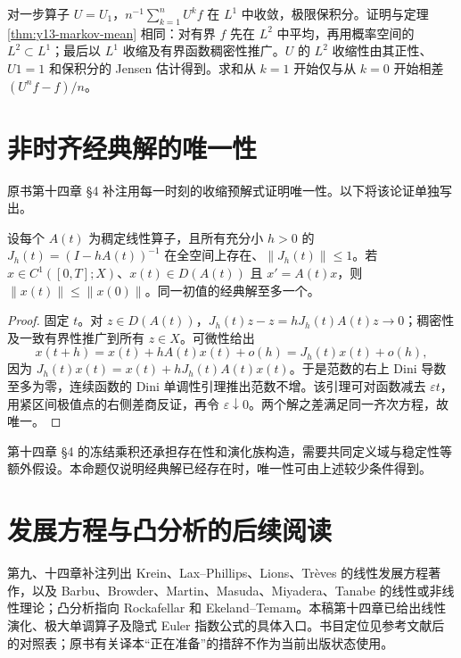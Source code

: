 对一步算子 $U=U_1$，$n^{-1}\sum_{k=1}^nU^kf$ 在 $L^1$ 中收敛，极限保积分。证明与定理 \ref{thm:y13-markov-mean} 相同：对有界 $f$ 先在 $L^2$ 中平均，再用概率空间的 $L^2\subset L^1$；最后以 $L^1$ 收缩及有界函数稠密性推广。$U$ 的 $L^2$ 收缩性由其正性、$U1=1$ 和保积分的 Jensen 估计得到。求和从 $k=1$ 开始仅与从 $k=0$ 开始相差 $(U^nf-f)/n$。

\section*{非时齐经典解的唯一性}
\label{sec:supp-uniqueness}
原书第十四章 §4 补注用每一时刻的收缩预解式证明唯一性。以下将该论证单独写出。
\begin{proposition}[冻结时刻的预解式估计]
设每个 $A(t)$ 为稠定线性算子，且所有充分小 $h>0$ 的 $J_h(t)=(I-hA(t))^{-1}$ 在全空间上存在、$\|J_h(t)\|\le1$。若 $x\in C^1([0,T];X)$、$x(t)\in D(A(t))$ 且 $x'=A(t)x$，则 $\|x(t)\|\le\|x(0)\|$。同一初值的经典解至多一个。
\end{proposition}
\begin{proof}
固定 $t$。对 $z\in D(A(t))$，$J_h(t)z-z=hJ_h(t)A(t)z\to0$；稠密性及一致有界性推广到所有 $z\in X$。可微性给出
\[
 x(t+h)=x(t)+hA(t)x(t)+o(h)=J_h(t)x(t)+o(h),
\]
因为 $J_h(t)x(t)=x(t)+hJ_h(t)A(t)x(t)$。于是范数的右上 Dini 导数至多为零，连续函数的 Dini 单调性引理推出范数不增。该引理可对函数减去 $\varepsilon t$，用紧区间极值点的右侧差商反证，再令 $\varepsilon\downarrow0$。两个解之差满足同一齐次方程，故唯一。
\end{proof}
第十四章 §4 的冻结乘积还承担存在性和演化族构造，需要共同定义域与稳定性等额外假设。本命题仅说明经典解已经存在时，唯一性可由上述较少条件得到。

\section*{发展方程与凸分析的后续阅读}
第九、十四章补注列出 Krein、Lax--Phillips、Lions、Tr\`eves 的线性发展方程著作，以及 Barbu、Browder、Martin、Masuda、Miyadera、Tanabe 的线性或非线性理论；凸分析指向 Rockafellar 和 Ekeland--Temam。本稿第十四章已给出线性演化、极大单调算子及隐式 Euler 指数公式的具体入口。书目定位见参考文献后的对照表；原书有关译本“正在准备”的措辞不作为当前出版状态使用。
